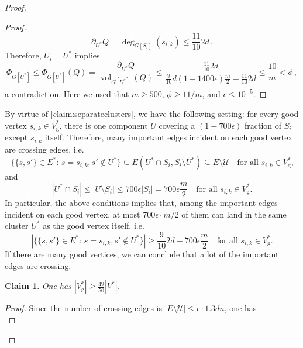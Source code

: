 \documentclass[epsfig,letter,11pt]{article}
\numberwithin{equation}{section}
\DeclareMathOperator{\vol}{vol}
\newcommand{\uncut}[2]{{\partial}_{#2} #1}
\DeclareMathOperator*{\good}{g}
\newtheorem{claim}[theorem]{Claim}
\begin{document}
\begin{proof}
\begin{proof}
	\begin{equation*}
		\uncut{Q}{U^*} = \deg_{G[S_i]}(s_{i,k}) \le  \frac{11}{10} 2d \, .
	\end{equation*}
	Therefore, $U_i = U^*$ implies
	\begin{equation*}
		\Phi_{G[U^*]} \le \Phi_{G[U^*]}(Q) = \frac{\uncut{Q}{U^*}}{\vol_{G[U^*]}(Q)} \le \frac{\frac{11}{10} 2d}{\frac{9}{10}d \left(1-1400{\epsilon}\right) \frac{m}{2}-\frac{11}{10}2d} \le \frac{10}{m} < \phi \, ,
	\end{equation*}
	a contradiction. Here we used that $m \ge 500$, $\phi \ge 11/m$, and $\epsilon \le 10^{-5}$.
\end{proof}
	\noindent
	By virtue of \cref{claim:separateclusters}, we have the following setting: for every good vertex $s_{i,k} \in V^*_{\text{g}}$, there is one component $U$ covering a $(1-700\epsilon)$ fraction of $S_i$ except $s_{i,k}$ itself. Therefore, many important edges incident on each good vertex are crossing edges, i.e.
	\begin{equation*}
		\{\{s,s'\} \in E^* : \, s = s_{i,k}, s' \notin U^*\} \subseteq E(U^* \cap S_i, S_i \setminus U^*) \subseteq E \setminus \mathcal{U} \quad \text{for all $s_{i,k} \in V^*_{\text{g}}$,}
	\end{equation*}
	and
	\begin{equation*}
		|U^* \cap S_i| \le  |U \setminus S_i| \le 700{\epsilon}  |S_i| = 700{\epsilon} \frac{m}{2}\quad \text{for all $s_{i,k} \in V^*_{\text{g}}$.}
	\end{equation*}
	In particular, the above conditions implies that, among the important edges incident on each good vertex, at most $700\epsilon \cdot m/2$ of them can land in the same cluster $U^*$ as the good vertex itself, i.e.
	\begin{equation}
		\label{eq:pervertexguarantee}
		|\{\{s,s'\} \in E^* : \, s = s_{i,k}, s' \notin U^*\}| \ge \frac{9}{10}2d - 700{\epsilon} \frac{m}{2}  \quad \text{for all $s_{i,k} \in V^*_{\text{g}}$.}
	\end{equation}
	If there are many good vertices, we can conclude that a lot of the important edges are crossing.
		\begin{claim}
		\label{claim:mannygood}
		One has $|V^*_{\good}| \ge  \frac{49}{50}|V^*| $.
	\end{claim}
	\begin{proof}
		Since the number of crossing edges is $|E \setminus \mathcal{U}| \le \epsilon \cdot 1.3 dn$, one has
		\begin{equation}
			\label{goodvertices:2}

\end{equation}
\end{proof}
\end{proof}
\end{document}
